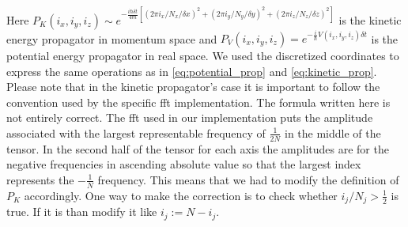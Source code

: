 Here $P_K(i_x, i_y, i_z) \sim e^{-\frac{i \hbar \delta t}{4m} \left[(2\pi i_x / N_x / \delta x)^2 + (2\pi i_y / N_y /\delta y)^2 + (2\pi i_z / N_z / \delta z)^2\right]}$ is the kinetic energy propagator in momentum space and $P_V(i_x, i_y, i_z) = e^{-\frac{i}{\hbar}V(i_x, i_y, i_z)\delta t}$ is the potential energy propagator in real space.
We used the discretized coordinates to express the same operations as in \ref{eq:potential_prop} and \ref{eq:kinetic_prop}.
Please note that in the kinetic propagator's case it is important to follow the convention used by the specific \acrshort{fft} implementation.
The formula written here is not entirely correct.
The \acrshort{fft} used in our implementation puts the amplitude associated with the largest representable frequency of $\frac{1}{2N}$ in the middle of the tensor.
In the second half of the tensor for each axis the amplitudes are for the negative frequencies in ascending absolute value so that the largest index represents the $-\frac{1}{N}$ frequency.
This means that we had to modify the definition of $P_K$ accordingly.
One way to make the correction is to check whether $i_j / N_j > \frac{1}{2}$ is true. If it is than modify it like $i_j := N - i_j$.

